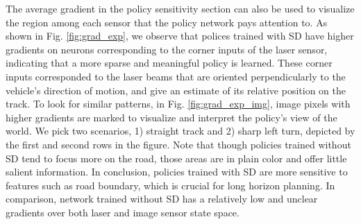 \documentclass[../thesis.tex]{subfiles}
\begin{document}
The average gradient in the policy sensitivity section can also be used to visualize the region among each sensor that the policy network pays attention to. As shown in Fig. \ref{fig:grad_exp}, we observe that polices trained with SD have higher gradients on neurons corresponding to the corner inputs of the laser sensor, indicating that a more sparse and meaningful policy is learned. These corner inputs corresponded to the laser beams that are oriented perpendicularly to the vehicle's direction of motion, and give an estimate of its relative position on the track. To look for similar patterns, in Fig. \ref{fig:grad_exp_img}, image pixels with higher gradients are marked to visualize and interpret the policy's view of the world. We pick two scenarios, 1) straight track and 2) sharp left turn, depicted by the first and second rows in the figure. Note that though policies trained without SD tend to focus more on the road, those areas are in plain color and offer little salient information. In conclusion, policies trained with SD are more sensitive to features such as road boundary, which is crucial for long horizon planning. In comparison, network trained without SD has a relatively low and unclear gradients over both laser and image sensor state space.




\end{document}
